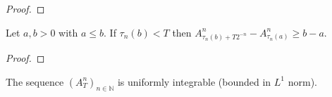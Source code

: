 \begin{proof}

\end{proof}


\begin{lemma}\label{lem:A_hittingAGT_sub_ge}
Let $a, b > 0$ with $a \le b$. If $\tau_n(b) < T$ then $A^n_{\tau_n(b)+T2^{-n}} - A^n_{\tau_n(a)} \ge b - a$.
\end{lemma}

\begin{proof}

\end{proof}


\begin{lemma}\label{lem:A_uniform_integrable}
  The sequence $(A^n_T)_{n\in\mathbb{N}}$ is uniformly integrable (bounded in $L^1$ norm).
\end{lemma}

